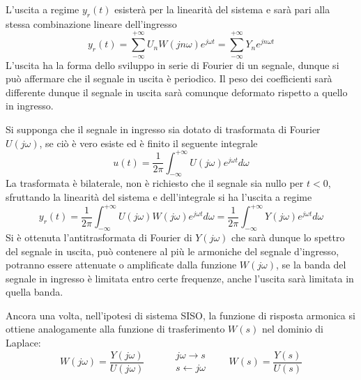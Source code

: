 L'uscita a regime $y_r(t)$ esisterà per la linearità del sistema e sarà pari
alla stessa combinazione lineare dell'ingresso
$$
y_r(t) = \sum_{-\infty}^{+\infty} U_nW(jn\omega)e^{j\omega t} =
\sum_{-\infty}^{+\infty}Y_n e^{j n \omega t}
$$
L'uscita ha la forma dello sviluppo in serie di Fourier di un segnale, dunque
si può affermare che il segnale in uscita è periodico.
Il peso dei coefficienti sarà differente dunque il segnale in uscita sarà
comunque deformato rispetto a quello in ingresso.

Si supponga che il segnale in ingresso sia dotato di trasformata di
Fourier $U(j\omega)$, se ciò è vero esiste ed è finito il seguente integrale
$$
u(t) = \frac{1}{2\pi}\int_{-\infty}^{+\infty} U(j\omega)e^{j\omega t}d\omega
$$
La trasformata è bilaterale, non è richiesto che il segnale sia nullo per
$t<0$, sfruttando la linearità del sistema e dell'integrale si ha l'uscita a
regime
$$
y_r(t) = \frac{1}{2\pi}\int_{-\infty}^{+\infty} U(j\omega) W(j\omega)
e^{j\omega t} d\omega = \frac{1}{2\pi}\int_{-\infty}^{+\infty} Y(j\omega)
e^{j\omega t} d\omega
$$
Si è ottenuta l'antitrasformata di Fourier di $Y(j\omega)$ che sarà dunque lo
spettro del segnale in uscita, può contenere al più le armoniche del segnale
d'ingresso, potranno essere attenuate o amplificate dalla funzione
$W(j\omega)$, se la banda del segnale in ingresso è limitata entro certe
frequenze, anche l'uscita sarà limitata in quella banda.

Ancora una volta, nell'ipotesi di sistema SISO, la funzione di risposta
armonica si ottiene analogamente alla funzione di trasferimento $W(s)$ nel
dominio di Laplace:
$$
W(j\omega) = \frac{Y(j\omega)}{U(j\omega)}
\qquad \begin{aligned}&j\omega \rightarrow s\\
&s\leftarrow j\omega
\end{aligned}\qquad W(s) =
\frac{Y(s)}{U(s)}
$$
